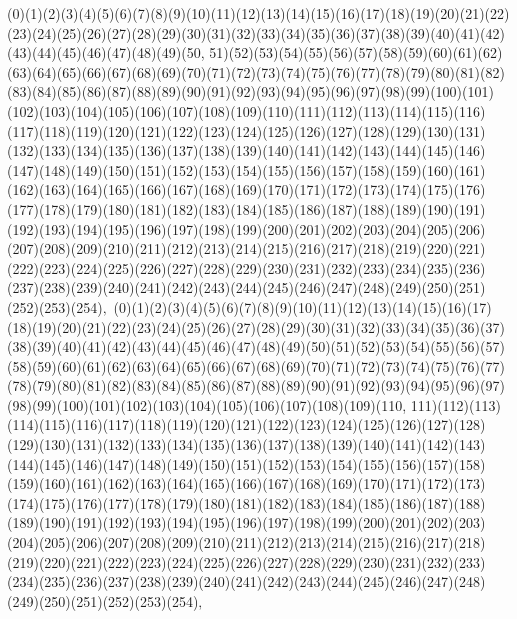 \documentclass[12pt]{article}
\begin{document}
{(0)(1)(2)(3)(4)(5)(6)(7)(8)(9)(10)(11)(12)(13)(14)(15)(16)(17)(18)(19)(20)(21)(22)(23)(24)(25)(26)(27)(28)(29)(30)(31)(32)(33)(34)(35)(36)(37)(38)(39)(40)(41)(42)(43)(44)(45)(46)(47)(48)(49)(50, 51)(52)(53)(54)(55)(56)(57)(58)(59)(60)(61)(62)(63)(64)(65)(66)(67)(68)(69)(70)(71)(72)(73)(74)(75)(76)(77)(78)(79)(80)(81)(82)(83)(84)(85)(86)(87)(88)(89)(90)(91)(92)(93)(94)(95)(96)(97)(98)(99)(100)(101)(102)(103)(104)(105)(106)(107)(108)(109)(110)(111)(112)(113)(114)(115)(116)(117)(118)(119)(120)(121)(122)(123)(124)(125)(126)(127)(128)(129)(130)(131)(132)(133)(134)(135)(136)(137)(138)(139)(140)(141)(142)(143)(144)(145)(146)(147)(148)(149)(150)(151)(152)(153)(154)(155)(156)(157)(158)(159)(160)(161)(162)(163)(164)(165)(166)(167)(168)(169)(170)(171)(172)(173)(174)(175)(176)(177)(178)(179)(180)(181)(182)(183)(184)(185)(186)(187)(188)(189)(190)(191)(192)(193)(194)(195)(196)(197)(198)(199)(200)(201)(202)(203)(204)(205)(206)(207)(208)(209)(210)(211)(212)(213)(214)(215)(216)(217)(218)(219)(220)(221)(222)(223)(224)(225)(226)(227)(228)(229)(230)(231)(232)(233)(234)(235)(236)(237)(238)(239)(240)(241)(242)(243)(244)(245)(246)(247)(248)(249)(250)(251)(252)(253)(254)$
, 
$
(0)(1)(2)(3)(4)(5)(6)(7)(8)(9)(10)(11)(12)(13)(14)(15)(16)(17)(18)(19)(20)(21)(22)(23)(24)(25)(26)(27)(28)(29)(30)(31)(32)(33)(34)(35)(36)(37)(38)(39)(40)(41)(42)(43)(44)(45)(46)(47)(48)(49)(50)(51)(52)(53)(54)(55)(56)(57)(58)(59)(60)(61)(62)(63)(64)(65)(66)(67)(68)(69)(70)(71)(72)(73)(74)(75)(76)(77)(78)(79)(80)(81)(82)(83)(84)(85)(86)(87)(88)(89)(90)(91)(92)(93)(94)(95)(96)(97)(98)(99)(100)(101)(102)(103)(104)(105)(106)(107)(108)(109)(110, 111)(112)(113)(114)(115)(116)(117)(118)(119)(120)(121)(122)(123)(124)(125)(126)(127)(128)(129)(130)(131)(132)(133)(134)(135)(136)(137)(138)(139)(140)(141)(142)(143)(144)(145)(146)(147)(148)(149)(150)(151)(152)(153)(154)(155)(156)(157)(158)(159)(160)(161)(162)(163)(164)(165)(166)(167)(168)(169)(170)(171)(172)(173)(174)(175)(176)(177)(178)(179)(180)(181)(182)(183)(184)(185)(186)(187)(188)(189)(190)(191)(192)(193)(194)(195)(196)(197)(198)(199)(200)(201)(202)(203)(204)(205)(206)(207)(208)(209)(210)(211)(212)(213)(214)(215)(216)(217)(218)(219)(220)(221)(222)(223)(224)(225)(226)(227)(228)(229)(230)(231)(232)(233)(234)(235)(236)(237)(238)(239)(240)(241)(242)(243)(244)(245)(246)(247)(248)(249)(250)(251)(252)(253)(254)$
, 
$
}
\end{document}
